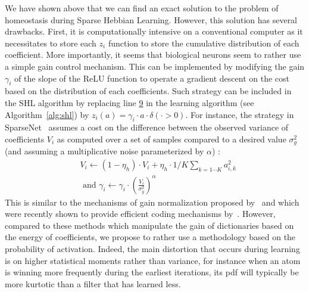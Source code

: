 \documentclass[vision,article,submit,oneauthor,pdftex]{Definitions/mdpi}
\newcommand{\seeFig}[1]{Figure~\ref{fig:#1}}%
\begin{document}
We have shown above that we can find an exact solution to the problem of homeostasis during Sparse Hebbian Learning. However, this solution has several drawbacks. First, it is computationally intensive on a conventional computer as it necessitates to store each $z_i$ function to store the cumulative distribution of each coefficient. More importantly, it seems that biological neurons seem to rather use a simple gain control mechanism. This can be implemented by modifying the gain $\gamma_i$ of the slope of the ReLU function to operate a gradient descent on the cost based on the distribution of each coefficients. Such strategy can be included in the SHL algorithm by replacing line \hyperlink{here2}{9} in the learning algorithm (see Algorithm~\ref{alg:shl}) by $z_i( a ) = \gamma_i \cdot a \cdot \delta(\cdot >0)$. For instance, the strategy in {\sc SparseNet}~\citep{Olshausen97} assumes a cost on the difference between the observed variance of coefficients $V_i$ as computed over a set of samples compared to a desired value $\sigma_g^2$ (and assuming a multiplicative noise parameterized by $\alpha$) :
\begin{align}
&V_i \leftarrow (1- \eta_h ) \cdot V_i + \eta_h \cdot 1/K\sum_{k=1\cdots K} a_{i, k}^2 \\ &\textrm{ and }
\gamma_i \leftarrow \gamma_i \cdot \left( \frac{V_i}{\sigma_g^2} \right)^\alpha
\end{align}%
This is similar to the mechanisms of gain normalization proposed by~\cite{Schwartz01} and which were recently shown to provide efficient coding mechanisms by~\cite{Simoncelli01}. However, compared to these methods which manipulate the gain of dictionaries based on the energy of coefficients, we propose to rather use a methodology based on the probability of activation. Indeed, the main distortion that occurs during learning is on higher statistical moments rather than variance, for instance when an atom is winning more frequently during the earliest iterations, its pdf will typically be more kurtotic than a filter that has learned less.
\end{document}
